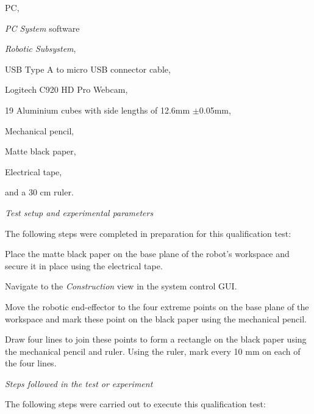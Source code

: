 \begin{compactitem}
	\item PC,
	\item \textit{PC System} software
	\item \textit{Robotic Subsystem},
	\item USB Type A to micro USB connector cable,
	\item Logitech C920 HD Pro Webcam,
	\item 19 Aluminium cubes with side lengths of 12.6mm $\pm$0.05mm,
	\item Mechanical pencil,
	\item Matte black paper,
	\item Electrical tape,
	\item and a 30 cm ruler.
\end{compactitem}

\textit{Test setup and experimental parameters}

The following steps were completed in preparation for this qualification test:

\begin{compactenum}
	\item Place the matte black paper on the base plane of the robot's workspace and secure it in place using the electrical tape.
	\item Navigate to the \textit{Construction} view in the system control GUI.
	\item Move the robotic end-effector to the four extreme points on the base plane of the workspace and mark these point on the black paper using the mechanical pencil.
	\item Draw four lines to join these points to form a rectangle on the black paper using the mechanical pencil and ruler. Using the ruler, mark every 10 mm on each of the four lines.
\end{compactenum}

\textit{Steps followed in the test or experiment}

The following steps were carried out to execute this qualification test:


